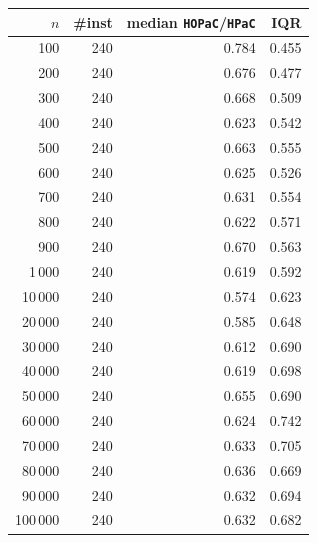 \begin{tabular}{@{}rrrr@{}}
\toprule
$n$ & \#inst & median \texttt{HOPaC}/\texttt{HPaC} & IQR \\
\midrule
100 & 240 & 0.784 & 0.455 \\
200 & 240 & 0.676 & 0.477 \\
300 & 240 & 0.668 & 0.509 \\
400 & 240 & 0.623 & 0.542 \\
500 & 240 & 0.663 & 0.555 \\
600 & 240 & 0.625 & 0.526 \\
700 & 240 & 0.631 & 0.554 \\
800 & 240 & 0.622 & 0.571 \\
900 & 240 & 0.670 & 0.563 \\
1\,000 & 240 & 0.619 & 0.592 \\
10\,000 & 240 & 0.574 & 0.623 \\
20\,000 & 240 & 0.585 & 0.648 \\
30\,000 & 240 & 0.612 & 0.690 \\
40\,000 & 240 & 0.619 & 0.698 \\
50\,000 & 240 & 0.655 & 0.690 \\
60\,000 & 240 & 0.624 & 0.742 \\
70\,000 & 240 & 0.633 & 0.705 \\
80\,000 & 240 & 0.636 & 0.669 \\
90\,000 & 240 & 0.632 & 0.694 \\
100\,000 & 240 & 0.632 & 0.682 \\
\bottomrule
\end{tabular}
